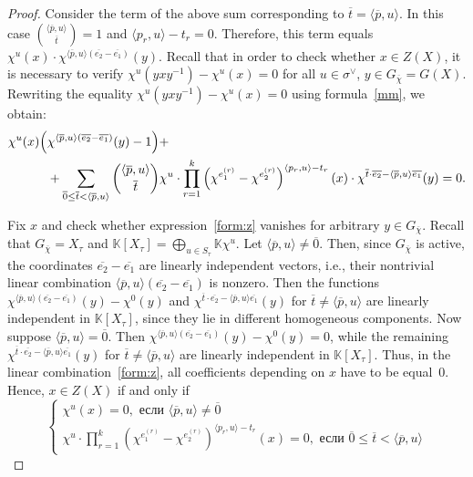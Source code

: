 \documentclass[a4paper, 11pt]{amsart}
\theoremstyle{plain}
\theoremstyle{remark}
\theoremstyle{definition}
\newcommand{\KK}{\mathbb{K}}
\newcommand{\GG}{G_{\overline{\chi}}}
\newcommand{\ol}[1]{\overline{#1}}
\begin{document}
\begin{proof}
Consider the term of the above sum corresponding to $\ol{t} = \langle \ol{p}, u \rangle$. In this case ${ \langle \ol{p}, u \rangle \choose \ol{t} } = 1$ and $\langle p_r , u\rangle - t_r = 0$. Therefore, this term equals $\chi^u(x) \cdot \chi^{\langle \ol{p}, u \rangle (\ol{e_2} - \ol{e_1})}(y)$. Recall that in order to check whether ${x \in Z(X)}$, it is necessary to verify $\chi^u(yxy^{-1}) - \chi^u(x) = 0$ for all $u \in \sigma^\vee$, $y \in \GG = G(X)$. Rewriting the equality $\chi^u(yxy^{-1}) - \chi^u(x) = 0$ using formula~\eqref{mm}, we obtain:
\begin{equation}
\label{form:z}
\begin{aligned}
\chi^u(x) \Bigl(&\chi^{\langle \ol{p}, u \rangle (\ol{e_2} - \ol{e_1})}(y) - 1 \Bigr) + \\ 
&+ \sum \limits_{\ol{0} \le \ol{t} < \langle \ol{p}, u \rangle} { \langle \ol{p}, u \rangle \choose \ol{t} }  
\chi^u \cdot \prod\limits_{r = 1}^{k}\left(\chi^{e_1^{(r)}} - \chi^{e_2^{(r)}}\right)^{\langle p_r , u\rangle - t_r} (x)
\cdot  \chi^{\ol{t}\cdot \ol{e_2} - \langle \ol{p}, u \rangle \ol{e_1}} (y) = 0.
\end{aligned}
\end{equation}

Fix $x$ and check whether expression~\eqref{form:z} vanishes for arbitrary $y \in \GG$. Recall that $\GG = X_\tau$ and $\KK[X_\tau] = \bigoplus_{u \in S_\tau} \KK \chi^u$. Let $\langle \ol{p}, u \rangle \neq \ol{0}$. Then, since $\GG$ is active, the coordinates ${\ol{e_2} - \ol{e_1}}$ are linearly independent vectors, i.e., their nontrivial linear combination $\langle \ol{p}, u \rangle (\ol{e_2} - \ol{e_1})$ is nonzero. Then the functions $\chi^{\langle \ol{p}, u \rangle (\ol{e_2} - \ol{e_1})}(y) - \chi^0(y)$ and $\chi^{\ol{t}\cdot \ol{e_2} - \langle \ol{p}, u \rangle \ol{e_1}} (y)$ for $\ol{t} \neq \langle \ol{p}, u \rangle$ are linearly independent in $\KK[X_\tau]$, since they lie in different homogeneous components. Now suppose $\langle \ol{p}, u \rangle = \ol{0}$. Then $\chi^{\langle \ol{p}, u \rangle (\ol{e_2} - \ol{e_1})}(y) - \chi^0(y) = 0$, while the remaining $\chi^{\ol{t}\cdot \ol{e_2} - \langle \ol{p}, u \rangle \ol{e_1}} (y)$ for $\ol{t} \neq \langle \ol{p}, u \rangle$ are linearly independent in $\KK[X_\tau]$. Thus, in the linear combination~\eqref{form:z}, all coefficients depending on $x$ have to be equal~$0$. Hence, $x \in Z(X)$ if and only if
\begin{equation}
   	\begin{cases}
   		\chi^u(x) = 0, \text{ если } \langle \ol{p}, u \rangle \neq \ol{0}\\
   		 \chi^u \cdot \prod\limits_{r = 1}^{k}\left( \chi^{e_1^{(r)}} - \chi^{e_2^{(r)}}\right)^{\langle p_r , u\rangle - t_r} (x) = 0, \text{ если } \ol{0} \le \ol{t} < \langle \ol{p}, u \rangle
   	\end{cases}
\end{equation}


\end{proof}
\end{document}

